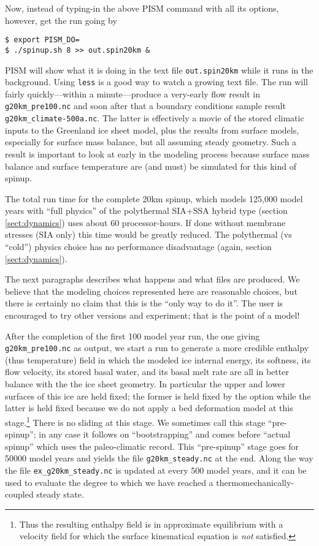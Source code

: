 Now, instead of typing-in the above PISM command with all its options, however, get the run going by
\begin{verbatim}
$ export PISM_DO=
$ ./spinup.sh 8 >> out.spin20km &
\end{verbatim}
\noindent PISM will show what it is doing in the text file \texttt{out.spin20km} while it runs in the background.  Using \texttt{less} is a good way to watch a growing text file.  The run will fairly quickly---within a minute---produce a very-early flow result in \texttt{g20km_pre100.nc} and soon after that a boundary conditions sample result \texttt{g20km_climate-500a.nc}.  The latter is effectively a movie of the stored climatic inputs to the Greenland ice sheet model, plus the results from surface models, especially for surface mass balance, but all assuming steady geometry.  Such a result is important to look at early in the modeling process because surface mass balance and surface temperature are (and must) be simulated for this kind of spinup.

The total run time for the complete 20km spinup, which models 125,000 model years with ``full physics'' of the polythermal SIA+SSA hybrid type (section \ref{sect:dynamics}) uses about 60 processor-hours.  If done without membrane stresses (SIA only) this time would be greatly reduced.  The polythermal (vs ``cold'') physics choice has no performance disadvantage (again, section \ref{sect:dynamics}).

The next paragraphs describes what happens and what files are produced.  We believe that the modeling choices represented here are reasonable choices, but there is certainly no claim that this is the ``only way to do it''.  The user is encouraged to try other versions and experiment; that is the point of a model!

After the completion of the first 100 model year run, the one giving \texttt{g20km_pre100.nc} as output, we start a run to generate a more credible enthalpy (thus temperature) field in which the modeled ice internal energy, its softness, its flow velocity, its stored basal water, and its basal melt rate are all in better balance with the the ice sheet geometry.  In particular the upper and lower surfaces of this ice are held fixed; the former is held fixed by the option  while the latter is held fixed because we do not apply a bed deformation model at this stage.\footnote{Thus the resulting enthalpy field is in approximate equilibrium with a velocity field for which the surface kinematical equation \cite{Fowler} is \emph{not} satisfied.}  There is no sliding at this stage.  We sometimes call this stage ``pre-spinup''; in any case it follows on ``bootstrapping'' and comes before ``actual spinup'' which uses the paleo-climatic record.  This ``pre-spinup'' stage goes for 50000 model years and yields the file \texttt{g20km_steady.nc} at the end.  Along the way the file \texttt{ex_g20km_steady.nc} is updated at every 500 model years, and it can be used to evaluate the degree to which we have reached a thermomechanically-coupled steady state.

